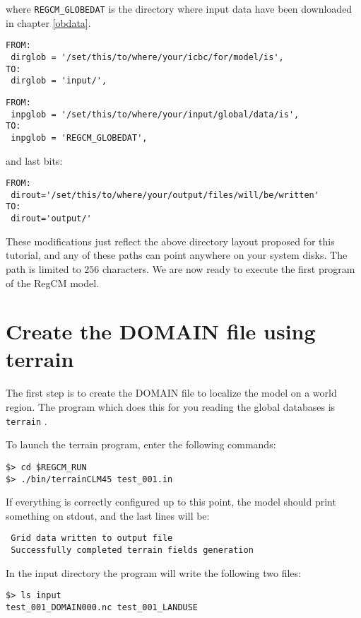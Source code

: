 where \verb=REGCM_GLOBEDAT= is the directory where input data have been
downloaded in chapter \ref{obdata}.

\begin{Verbatim}
FROM:
 dirglob = '/set/this/to/where/your/icbc/for/model/is',
TO:
 dirglob = 'input/',
\end{Verbatim}

\begin{Verbatim}
FROM:
 inpglob = '/set/this/to/where/your/input/global/data/is',
TO:
 inpglob = 'REGCM_GLOBEDAT',
\end{Verbatim}

and last bits:

\begin{Verbatim}
FROM:
 dirout='/set/this/to/where/your/output/files/will/be/written'
TO:
 dirout='output/'
\end{Verbatim}

These modifications just reflect the above directory layout proposed for this
tutorial, and any of these paths can point anywhere on your system disks.
The path is limited to $256$ characters.
We are now ready to execute the first program of the RegCM model.

\section{Create the DOMAIN file using terrain}

The first step is to create the DOMAIN file to localize the model on a world
region.
The program which does this for you reading the global databases is
\verb=terrain= .

To launch the terrain program, enter the following commands:

\begin{Verbatim}
$> cd $REGCM_RUN
$> ./bin/terrainCLM45 test_001.in
\end{Verbatim}

If everything is correctly configured up to this point, the model should print
something on stdout, and the last lines will be:

\begin{Verbatim}
 Grid data written to output file                                               
 Successfully completed terrain fields generation
\end{Verbatim}

In the input directory the program will write the following two files:

\begin{Verbatim}
$> ls input
test_001_DOMAIN000.nc test_001_LANDUSE
\end{Verbatim}

